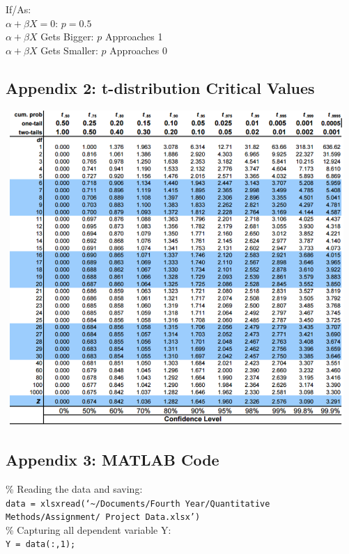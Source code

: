\documentclass[11pt, english]{article}
\begin{document}
	If/As:\\
	$\alpha+\beta X=0$: $p=0.5$\\
	$\alpha+\beta X$ Gets Bigger: $p$ Approaches 1\\
	$\alpha+\beta X$ Gets Smaller: $p$ Approaches 0

	\newpage

	\subsection*{Appendix 2: t-distribution Critical Values}

	\begin{center}
		\includegraphics[height=12cm,width=13cm]{AG432-IMG/a.PNG}
	\end{center}

	\newpage

	\subsection*{Appendix 3: MATLAB Code}

	\% Reading the data and saving:\\
	\texttt{data = xlsxread(`\~{}/Documents/Fourth Year/Quantitative Methods/Assignment/ Project Data.xlsx')}\\

	\% Capturing all dependent variable Y:\\
	\texttt{Y = data(:,1);}\\
\end{document}
